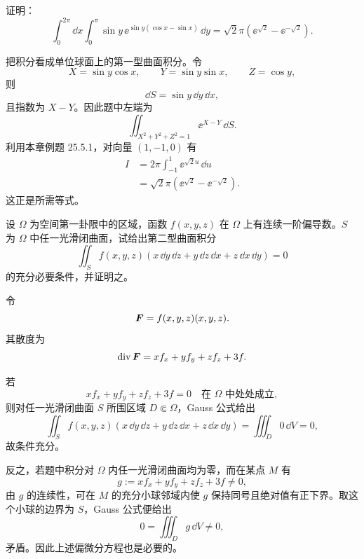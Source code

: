 \begin{xreferenceproblem}[2]
证明：
\[
  \int_0^{2\pi}\dd x\int_0^\pi\sin y\,\ee^{\sin y(\cos x-\sin x)}\,\dd y
  =\sqrt2\pi(\ee^{\sqrt2}-\ee^{-\sqrt2}).
\]
\end{xreferenceproblem}
\begin{xsolution}
把积分看成单位球面上的第一型曲面积分。令
\[
  X=\sin y\cos x,\qquad Y=\sin y\sin x,\qquad Z=\cos y,
\]
则
\[
  \dd S=\sin y\,\dd y\,\dd x,
\]
且指数为 $X-Y$。因此题中左端为
\[
  \iint_{X^2+Y^2+Z^2=1}\ee^{X-Y}\,\dd S.
\]
利用本章例题 25.5.1，对向量 $(1,-1,0)$ 有
\begin{align*}
I
&=2\pi\int_{-1}^{1}\ee^{\sqrt2u}\,\dd u\\
&=\sqrt2\pi(\ee^{\sqrt2}-\ee^{-\sqrt2}).
\end{align*}
这正是所需等式。
\end{xsolution}


\begin{xreferenceproblem}[3]
设 $\Omega$ 为空间第一卦限中的区域，函数 $f(x,y,z)$ 在 $\Omega$ 上有连续一阶偏导数。$S$ 为 $\Omega$ 中任一光滑闭曲面，试给出第二型曲面积分
\[
  \iint_S f(x,y,z)(x\,\dd y\,\dd z+y\,\dd z\,\dd x+z\,\dd x\,\dd y)=0
\]
的充分必要条件，并证明之。
\end{xreferenceproblem}
\begin{xsolution}
令
\[
  \bm{F}=f(x,y,z)(x,y,z).
\]
其散度为
\[
  \operatorname{div}\bm{F}
  =xf_x+yf_y+zf_z+3f.
\]

若
\[
  \boxed{xf_x+yf_y+zf_z+3f=0\quad\text{在 }\Omega\text{ 中处处成立}},
\]
则对任一光滑闭曲面 $S$ 所围区域 $D\Subset\Omega$，Gauss 公式给出
\[
  \iint_S f(x,y,z)(x\,\dd y\,\dd z+y\,\dd z\,\dd x+z\,\dd x\,\dd y)
  =\iiint_D0\,\dd V=0,
\]
故条件充分。

反之，若题中积分对 $\Omega$ 内任一光滑闭曲面均为零，而在某点 $M$ 有
\[
  g:=xf_x+yf_y+zf_z+3f\ne0,
\]
由 $g$ 的连续性，可在 $M$ 的充分小球邻域内使 $g$ 保持同号且绝对值有正下界。取这个小球的边界为 $S$，Gauss 公式便给出
\[
  0=\iiint_Dg\,\dd V\ne0,
\]
矛盾。因此上述偏微分方程也是必要的。
\end{xsolution}


